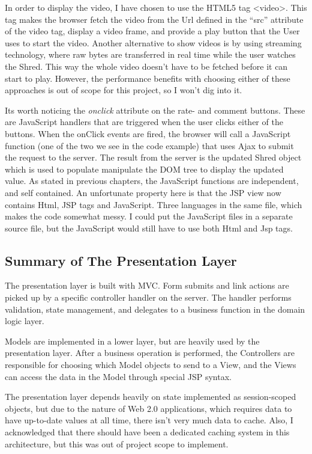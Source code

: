 In order to display the video, I have chosen to use the HTML5 tag <video>. This tag makes the browser fetch the video from the Url defined in the ``src'' attribute of the video tag, display a video frame, and provide a play button that the User uses to start the video. Another alternative to show videos is by using streaming technology, where raw bytes are transferred in real time while the user watches the Shred. This way the whole video doesn't have to be fetched before it can start to play. However, the performance benefits with choosing either of these approaches is out of scope for this project, so I won't dig into it. 

Its worth noticing the \textit{onclick} attribute on the rate- and comment buttons. These are JavaScript handlers that are triggered when the user clicks either of the buttons. When the onClick events are fired, the browser will call a JavaScript function (one of the two we see in the code example) that uses Ajax to submit the request to the server. The result from the server is the updated Shred object which is used to populate manipulate the DOM tree to display the updated value. As stated in previous chapters, the JavaScript functions are independent, and self contained. An unfortunate property here is that the JSP view now contains Html, JSP tags and JavaScript. Three languages in the same file, which makes the code somewhat messy. I could put the JavaScript files in a separate source file, but the JavaScript would still have to use both Html and Jsp tags. 

\subsection{Summary of The Presentation Layer}
The presentation layer is built with MVC. Form submits and link actions are picked up by a specific controller handler on the server. The handler performs validation, state management, and delegates to a business function in the domain logic layer.

Models are implemented in a lower layer, but are heavily used by the presentation layer. After a business operation is performed, the Controllers are responsible for choosing which Model objects to send to a View, and the Views can access the data in the Model through special JSP syntax.

The presentation layer depends heavily on state implemented as session-scoped objects, but due to the nature of Web 2.0 applications, which requires data to have up-to-date values at all time, there isn't very much data to cache. Also, I acknowledged that there should have been a dedicated caching system in this architecture, but this was out of project scope to implement.
			
